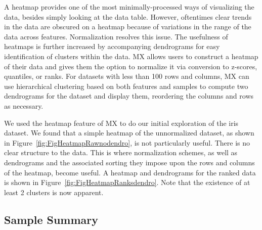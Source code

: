 \documentclass{article}
\begin{document}
A heatmap provides one of the most minimally-processed ways of visualizing the data, besides simply looking at the data table. However, oftentimes clear trends in the data are obscured on a heatmap because of variations in the range of the data across features. Normalization resolves this issue. The usefulness of heatmaps is further increased by accompanying dendrograms for easy identification of clusters within the data. MX allows users to construct a heatmap of their data and gives them the option to normalize it via conversion to z-scores, quantiles, or ranks. For datasets with less than 100 rows and columns, MX can use hierarchical clustering based on both features and samples to compute two dendrograms for the dataset and display them, reordering the columns and rows as necessary. 

We used the heatmap feature of MX to do our initial exploration of the iris dataset. We found that a simple heatmap of the unnormalized dataset, as shown in Figure~\ref{fig:FigHeatmapRawnodendro}, is not particularly useful. There is no clear structure to the data. This is where normalization schemes, as well as dendrograms and the associated sorting they impose upon the rows and columns of the heatmap, become useful. A heatmap and dendrograms for the ranked data is shown in Figure~\ref{fig:FigHeatmapRanksdendro}. Note that the existence of at least 2 clusters is now apparent.

\subsection{Sample Summary}
\label{subsec:SubSecSample}
\end{document}
